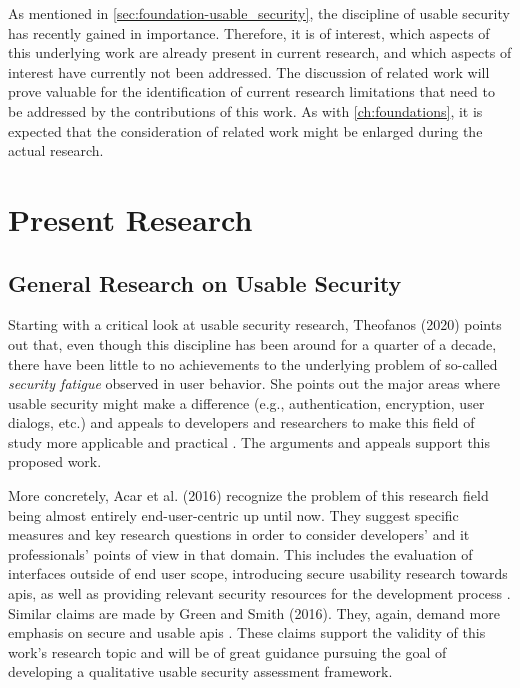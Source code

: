 As mentioned in \autoref{sec:foundation-usable_security}, the discipline of usable security has recently gained in importance. Therefore, it is of interest, which aspects of this underlying work are already present in current research, and which aspects of interest have currently not been addressed. The discussion of related work will prove valuable for the identification of current research limitations that need to be addressed by the contributions of this work. As with \autoref{ch:foundations}, it is expected that the consideration of related work might be enlarged during the actual research.

\section{Present Research}

\subsection{General Research on Usable Security}

Starting with a critical look at usable security research, Theofanos (2020) points out that, even though this discipline has been around for a quarter of a decade, there have been little to no achievements to the underlying problem of so-called \textit{security fatigue} observed in user behavior. She points out the major areas where usable security might make a difference (e.g., authentication, encryption, user dialogs, etc.) and appeals to developers and researchers to make this field of study more applicable and practical \cite{theofanos_is_2020}. The arguments and appeals support this proposed work.

More concretely, Acar et al. (2016) recognize the problem of this research field being almost entirely end-user-centric up until now. They suggest specific measures and key research questions in order to consider developers' and \ac{it} professionals' points of view in that domain. This includes the evaluation of interfaces outside of end user scope, introducing secure usability research towards \acp{api}, as well as providing relevant security resources for the development process \cite{acar_you_2016}. Similar claims are made by Green and Smith (2016). They, again, demand more emphasis on secure and usable \acp{api} \cite{green_developers_2016}. These claims support the validity of this work's research topic and will be of great guidance pursuing the goal of developing a qualitative usable security assessment framework.

